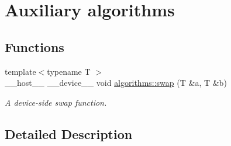 \hypertarget{group__auxiliary__algorithms}{}\section{Auxiliary algorithms}
\label{group__auxiliary__algorithms}
\subsection*{Functions}
\begin{DoxyCompactItemize}
\item 
{\footnotesize template$<$typename T $>$ }\\\+\_\+\+\_\+host\+\_\+\+\_\+ \+\_\+\+\_\+device\+\_\+\+\_\+ void \hyperlink{group__auxiliary__algorithms_ga8bffe5209ec351179a96aed81aab0978}{algorithms\+::swap} (T \&a, T \&b)\hypertarget{group__auxiliary__algorithms_ga8bffe5209ec351179a96aed81aab0978}{}\label{group__auxiliary__algorithms_ga8bffe5209ec351179a96aed81aab0978}

\begin{DoxyCompactList}\small\item\em A device-\/side swap function. \end{DoxyCompactList}\end{DoxyCompactItemize}


\subsection{Detailed Description}
